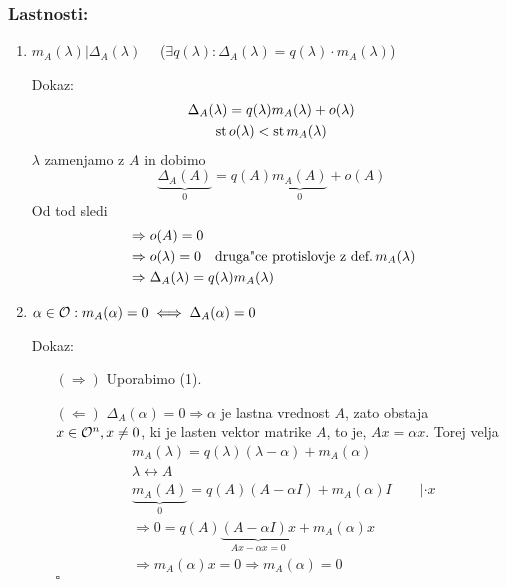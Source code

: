 \subsubsection*{Lastnosti:}
\begin{enumerate}[(1)]
	\item $m_A(\lambda) | \Delta_A(\lambda) \quad $ ($\exists q(\lambda): \Delta_A(\lambda) = q(\lambda) \cdot m_A(\lambda)$)
	
	Dokaz:
	\begin{gather*}
	\Delta_A(\lambda) = q(\lambda)m_A (\lambda) + o(\lambda) \\
	\operatorname{st} o(\lambda) < \operatorname{st} m_A(\lambda)
	\end{gather*}
	$\lambda$ zamenjamo z $A$ in dobimo
	\begin{equation*}
	\underbrace{\Delta_A(A)}_0 = q(A) \underbrace{m_A(A)}_0 + o(A)
	\end{equation*}
	Od tod sledi
	\begin{align*}
	&\Rightarrow o(A) = 0 \\
	& \Rightarrow o(\lambda) = 0 \quad \text{druga"ce protislovje z def.\,$m_A(\lambda)$} \\
	& \Rightarrow \Delta_A(\lambda) = q(\lambda) m_A(\lambda)
	\end{align*}
	
	\item $\alpha \in \mathcal{O}: m_A(\alpha) = 0 \iff \Delta_A(\alpha) = 0$
	
	Dokaz:
	\begin{itemize}
	\item[$(\Rightarrow)$] Uporabimo (1).
	\item[$(\Leftarrow)$] $\Delta_A(\alpha) = 0 \Rightarrow \alpha$ je lastna vrednost $A$, zato obstaja $x \in \mathcal{O}^n, x \neq 0$, ki je lasten vektor matrike $A$, to je, $Ax = \alpha x$. Torej velja
	\begin{gather*}
	m_A(\lambda) = q(\lambda)(\lambda - \alpha) + m_A (\alpha) \\
	\lambda \leftrightarrow A \\
	\underbrace{m_A(A)}_0 = q(A) (A - \alpha I) + m_A(\alpha)I \qquad | \cdot x \\
	\Rightarrow 0 = q(A) \underbrace{(A - \alpha I)x}_{Ax - \alpha x = 0} + m_A(\alpha)x \\
	\Rightarrow m_A(\alpha)x = 0 \Rightarrow m_A(\alpha) = 0
	\end{gather*}
	\hfill $\square$
	\end{itemize}
\end{enumerate}

